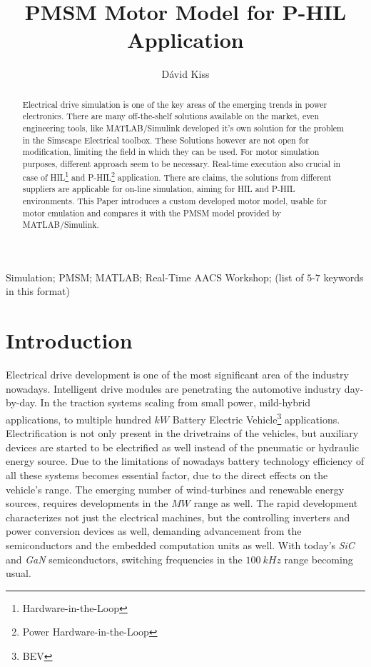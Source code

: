 \documentclass[twoside,b5paper,10pt]{article}
\title{PMSM Motor Model for P-HIL Application}
\author{Dávid Kiss}
\begin{document}
\makeAutStyleTitle

\begin{abstract}
Electrical drive simulation is one of the key areas of the emerging trends in power electronics. There are many off-the-shelf solutions available on the market, even engineering tools, like MATLAB/Simulink developed it's own solution for the problem in the Simscape Electrical toolbox. These Solutions however are not open for modification, limiting the field in which they can be used. For motor simulation purposes, different approach seem to be necessary. Real-time execution also crucial in case of HIL\footnote{Hardware-in-the-Loop} and P-HIL\footnote{Power Hardware-in-the-Loop} application.
There are claims, the solutions from different suppliers are applicable for on-line simulation, aiming for HIL and P-HIL environments. This Paper introduces a custom developed motor model, usable for motor emulation and compares it with the PMSM model provided by MATLAB/Simulink.
\end{abstract}


\begin{keywords}
Simulation; PMSM; MATLAB; Real-Time AACS Workshop; (list of $5$-$7$ keywords in this
format)
\end{keywords}

\listoftodos

\section{Introduction}
\label{sec:Introdu}

Electrical drive development is one of the most significant area of the industry nowadays. Intelligent drive modules are penetrating the automotive industry day-by-day. In the traction systems scaling from small power, mild-hybrid applications, to multiple hundred $kW$ Battery Electric Vehicle\footnote{BEV} applications. Electrification is not only present in the drivetrains of the vehicles, but auxiliary devices are started to be electrified as well instead of the pneumatic or hydraulic energy source. Due to the limitations of nowadays battery technology efficiency of all these systems becomes essential factor, due to the direct effects on the vehicle's range.  The emerging number of wind-turbines and renewable energy sources, requires developments in the $MW$ range as well. The rapid development characterizes not just the electrical machines, but the controlling inverters and power conversion devices as well, demanding advancement from the semiconductors and the embedded computation units as well. With today's \emph{SiC} and \emph{GaN} semiconductors, switching frequencies in the $100\ kHz$ range becoming usual.
\end{document}
